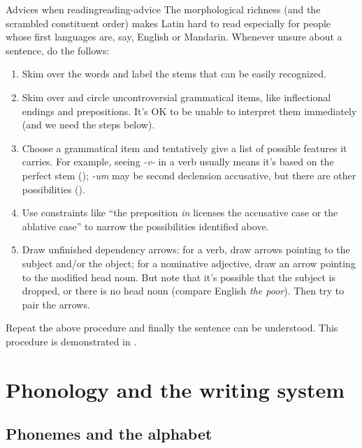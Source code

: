 \documentclass[a4paper, oneside]{report}
\newcommand{\form}[1]{\emph{#1}}
\begin{document}
\begin{learnbox}{Advices when reading}{reading-advice}
    The morphological richness (and the scrambled constituent order)
    makes Latin hard to read 
    especially for people whose first languages are, say, 
    English or Mandarin. 
    Whenever unsure about a sentence, do the follows: 
    \begin{enumerate}
        \item Skim over the words and label the stems that can be easily recognized.  
        \item Skim over and circle uncontroversial grammatical items,  
            like inflectional endings and prepositions. 
            It's OK to be unable to interpret them immediately (and we need the steps below).
        \item Choose a grammatical item and tentatively give a list of possible features it carries.  
            For example, seeing \form{-v-} in a verb usually means
            it's based on the perfect stem
            ();
            \form{-um} may be second declension accusative,
            but there are other possibilities
            (). 
        \item Use constraints like 
            ``the preposition \form{in} licenses the accusative case or the ablative case'' 
            to narrow the possibilities identified above.
        \item Draw unfinished dependency arrows:
            for a verb, draw arrows pointing to the subject and/or the object; 
            for a nominative adjective, draw an arrow pointing to the modified head noun. 
            But note that it's possible that the subject is dropped, 
            or there is no head noun (compare English \form{the poor}).
            Then try to pair the arrows.
    \end{enumerate}
    Repeat the above procedure and finally the sentence can be understood. 
    This procedure is demonstrated in .
\end{learnbox}

\chapter{Phonology and the writing system}

\section{Phonemes and the alphabet}
\end{document}
